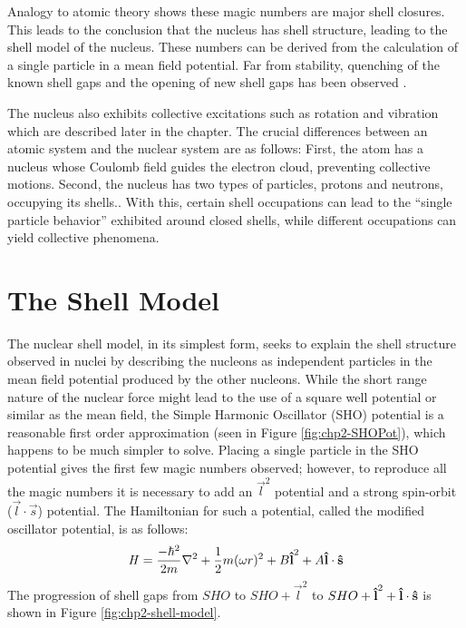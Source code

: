 Analogy to atomic theory shows these magic numbers are major shell closures. This leads to the conclusion that the nucleus has shell structure, leading to the shell model of the nucleus. These numbers can be derived from the calculation of a single particle in a mean field potential. Far from stability, quenching of the known shell gaps and the opening of new shell gaps has been observed \cite{changingShells}.

The nucleus also exhibits collective excitations such as rotation and vibration which are described later in the chapter. The crucial differences between an atomic system and the nuclear system are as follows: First, the atom has a nucleus whose Coulomb field guides the electron cloud, preventing collective motions. Second, the nucleus has two types of particles, protons and neutrons, occupying its shells.. With this, certain shell occupations can lead to the ``single particle behavior'' exhibited around closed shells, while different occupations can yield collective phenomena.

\section{The Shell Model}
\label{sec:models-shell-model}
The nuclear shell model, in its simplest form, seeks to explain the shell structure observed in nuclei by describing the nucleons as independent particles in the mean field potential produced by the other nucleons. While the short range nature of the nuclear force might lead to the use of a square well potential or similar as the mean field, the Simple Harmonic Oscillator (SHO) potential is a reasonable first order approximation (seen in Figure \ref{fig:chp2-SHOPot}), which happens to be much simpler to solve. Placing a single particle in the SHO potential gives the first few magic numbers observed; however, to reproduce all the magic numbers it is necessary to add an $\vec{l}^2$ potential and a strong spin-orbit ($\vec{l}\cdot\vec{s}$) potential. The Hamiltonian for such a potential, called the modified oscillator potential, is as follows:
\begin{equation}
\label{eqn:chp2-sm-sho-hamil}
\mathbf{\mathit{H}} = \frac{-\hbar^2}{2m}\nabla^2 + \frac{1}{2}m(\omega r)^2 + B \boldsymbol{\hat{\textbf{l}}}^2 + A \boldsymbol{\hat{\textbf{l}}}\cdot{}\boldsymbol{\hat{\textbf{s}}}
\end{equation}
The progression of shell gaps from $SHO$ to $SHO + \vec{l}^2$ to $SHO + \boldsymbol{\hat{\textbf{l}}}^2 + \boldsymbol{\hat{\textbf{l}}}\cdot\boldsymbol{\hat{\textbf{s}}}$ is shown in Figure \ref{fig:chp2-shell-model}.

